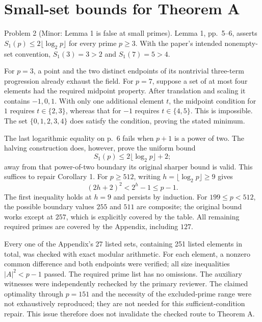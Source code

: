 \documentclass[10pt]{article}
\begin{document}
\section*{Small-set bounds for Theorem A}
Problem 2 (Minor: Lemma 1 is false at small primes).  Lemma 1, pp. 5–6, asserts \(S_1(p)\le2\lfloor\log_2p\rfloor\) for every prime \(p\ge3\). With the paper’s intended nonempty-set convention, \(S_1(3)=3>2\) and \(S_1(7)=5>4\).\par
For \(p=3\), a point and the two distinct endpoints of its nontrivial three-term progression already exhaust the field. For \(p=7\), suppose a set of at most four elements had the required midpoint property. After translation and scaling it contains \(-1,0,1\). With only one additional element \(t\), the midpoint condition for \(1\) requires \(t\in\{2,3\}\), whereas that for \(-1\) requires \(t\in\{4,5\}\). This is impossible. The set \(\{0,1,2,3,4\}\) does satisfy the condition, proving the stated minimum.\par
The last logarithmic equality on p. 6 fails when \(p+1\) is a power of two. The halving construction does, however, prove the uniform bound \[S_1(p)\le2\lfloor\log_2p\rfloor+2;\] away from that power-of-two boundary its original sharper bound is valid. This suffices to repair Corollary 1. For \(p\ge512\), writing \(h=\lfloor\log_2p\rfloor\ge9\) gives \[(2h+2)^2<2^h-1\le p-1.\] The first inequality holds at \(h=9\) and persists by induction. For \(199\le p<512\), the possible boundary values \(255\) and \(511\) are composite; the original bound works except at \(257\), which is explicitly covered by the table. All remaining required primes are covered by the Appendix, including \(127\).\par
Every one of the Appendix’s 27 listed sets, containing 251 listed elements in total, was checked with exact modular arithmetic. For each element, a nonzero common difference and both endpoints were verified; all size inequalities \(|A|^2<p-1\) passed. The required prime list has no omissions. The auxiliary witnesses were independently rechecked by the primary reviewer. The claimed optimality through \(p=151\) and the necessity of the excluded-prime range were not exhaustively reproduced; they are not needed for this sufficient-condition repair. This issue therefore does not invalidate the checked route to Theorem A.\par
\end{document}
